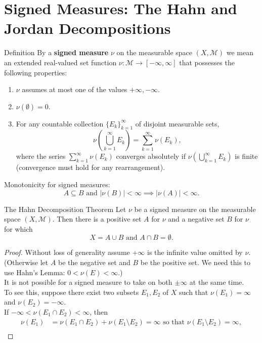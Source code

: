 \section{Signed Measures: The Hahn and Jordan Decompositions}
\begin{flushleft}
	\begin{namedthm*}{Definition}
		By a \textbf{signed measure} $\nu$ on the measurable space $(X,\mathcal{M})$ we mean an extended real-valued set function $\nu:\mathcal{M}\to[-\infty,\infty]$ that possesses the following properties:
		\begin{enumerate}[label=(\roman*),align=left]  
			\item $\nu$ assumes at most one of the values $+\infty,-\infty$.
			\item $\nu(\emptyset)=0$.
			\item For any countable collection $\{E_k\}_{k=1}^\infty$ of disjoint measurable sets,
			\[
				\nu\left(\bigcup_{k=1}^\infty E_k\right)=\sum_{k=1}^\infty\nu(E_k),
			\]
			where the series $\sum_{k=1}^\infty\nu(E_k)$ converges absolutely if $\nu(\bigcup_{k=1}^\infty E_k)$ is finite (convergence must hold for any rearrangement).
		\end{enumerate}
	\end{namedthm*}
	Monotonicity for signed measures:
	\[
	A\subseteq B\text{ and }|\nu(B)|<\infty\implies|\nu(A)|<\infty.
	\]
	\begin{namedthm*}{The Hahn Decomposition Theorem}
		Let $\nu$ be a signed measure on the measurable space $(X,\mathcal{M})$.
		Then there is a positive set $A$ for $\nu$ and a negative set $B$ for $\nu$ for which
		\[
			X=A\cup B\text{ and }A\cap B=\emptyset.	
		\]
	\end{namedthm*}
	\begin{proof}
		Without loss of generality assume $+\infty$ is the infinite value omitted by $\nu$.
		(Otherwise let $A$ be the negative set and $B$ be the positive set. We need this to use Hahn's Lemma: $0<\nu(E)<\infty$.)
		\\\bigskip It is not possible for a signed measure to take on both $\pm\infty$ at the same time.
		\\To see this, suppose there exist two subsets $E_1,E_2$ of $X$ such that $\nu(E_1)=\infty$ and $\nu(E_2)=-\infty$.
		\\If $-\infty<\nu(E_1\cap E_2)<\infty$, then 
		\begin{align*}
			\nu(E_1)&=\nu(E_1\cap E_2)+\nu(E_1\setminus E_2)=\infty\text{ so that }\nu(E_1\setminus E_2)=\infty,\\

\end{align*}
\end{proof}
\end{flushleft}
